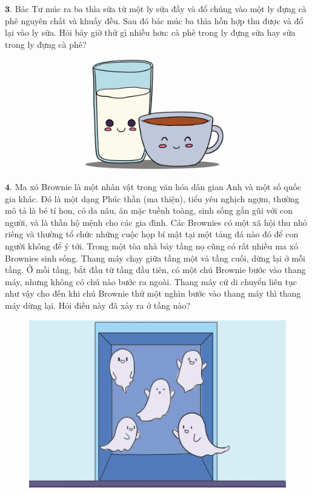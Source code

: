\begin{multicols}{2}
\begin{figure}[H]
		\vspace*{-15pt}
	\end{figure}
	$\pmb{3.}$ 	Bác Tư múc ra ba thìa sữa từ một ly sữa đầy và đổ chúng vào một ly đựng cà phê nguyên chất và khuấy đều. Sau đó bác múc ba thìa hỗn hợp thu được và đổ lại vào ly sữa. Hỏi bây giờ thứ gì nhiều hơn: cà phê trong ly đựng sữa hay sữa trong ly đựng cà phê?
	\begin{figure}[H]
		\centering
		\vspace*{5pt}
		\captionsetup{labelformat= empty, justification=centering}
		\includegraphics[width=1\linewidth]{Pi4_bai3}
		\vspace*{-15pt}
	\end{figure}
	$\pmb{4.}$ Ma xó Brownie là một nhân vật trong văn hóa dân gian Anh và một số quốc gia khác. Đó là một dạng Phúc thần (ma thiện), tiểu yêu nghịch ngợm, thường mô tả là bé tí hon, có da nâu, ăn mặc tuềnh toàng, sinh sống gần gũi với con người, và là thần hộ mệnh cho các gia đình. Các Brownies có một xã hội thu nhỏ riêng và thường tổ chức những cuộc họp bí mật tại một tảng đá nào đó để con người không để ý tới. 
	\vskip 0.1cm
	Trong một tòa nhà bảy tầng nọ cũng có rất nhiều ma xó Brownies sinh sống. Thang máy chạy giữa tầng một và tầng cuối, dừng lại ở mỗi tầng. Ở mỗi tầng, bắt đầu từ tầng đầu tiên, có một chú Brownie bước vào thang máy, nhưng không có chú nào bước ra ngoài. Thang máy cứ di chuyển liên tục như vậy cho đến khi chú Brownie thứ một nghìn bước vào thang máy thì thang máy dừng lại. Hỏi điều này đã xảy ra ở tầng nào?
	\begin{figure}[H]
		\centering
		\vspace*{-5pt}
		\captionsetup{labelformat= empty, justification=centering}
		\includegraphics[width=1\linewidth]{Pi4_bai4}

\end{figure}
\end{multicols}
